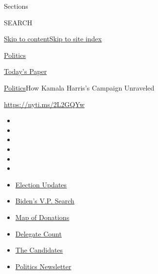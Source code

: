 Sections

SEARCH

\protect\hyperlink{site-content}{Skip to
content}\protect\hyperlink{site-index}{Skip to site index}

\href{https://www.nytimes.com/section/politics}{Politics}

\href{https://myaccount.nytimes.com/auth/login?response_type=cookie\&client_id=vi}{}

\href{https://www.nytimes.com/section/todayspaper}{Today's Paper}

\href{/section/politics}{Politics}\textbar{}How Kamala Harris's Campaign
Unraveled

\url{https://nyti.ms/2L2GQYw}

\begin{itemize}
\item
\item
\item
\item
\item
\item
\end{itemize}

\begin{itemize}
\item
  \href{https://www.nytimes.com/2020/07/31/us/elections/biden-vs-trump.html?action=click\&pgtype=Article\&state=default\&region=TOP_BANNER\&context=storylines_menu}{Election
  Updates}
\item
  \href{https://www.nytimes.com/article/biden-vice-president-2020.html?action=click\&pgtype=Article\&state=default\&region=TOP_BANNER\&context=storylines_menu}{Biden's
  V.P. Search}
\item
  \href{https://www.nytimes.com/interactive/2020/07/24/us/politics/trump-biden-campaign-donors.html?action=click\&pgtype=Article\&state=default\&region=TOP_BANNER\&context=storylines_menu}{Map
  of Donations}
\item
  \href{https://www.nytimes.com/interactive/2020/us/elections/delegate-count-primary-results.html?action=click\&pgtype=Article\&state=default\&region=TOP_BANNER\&context=storylines_menu}{Delegate
  Count}
\item
  \href{https://www.nytimes.com/interactive/2019/us/politics/2020-presidential-candidates.html?action=click\&pgtype=Article\&state=default\&region=TOP_BANNER\&context=storylines_menu}{The
  Candidates}
\item
  \href{https://www.nytimes.com/newsletters/politics?action=click\&pgtype=Article\&state=default\&region=TOP_BANNER\&context=storylines_menu}{Politics
  Newsletter}
\end{itemize}

